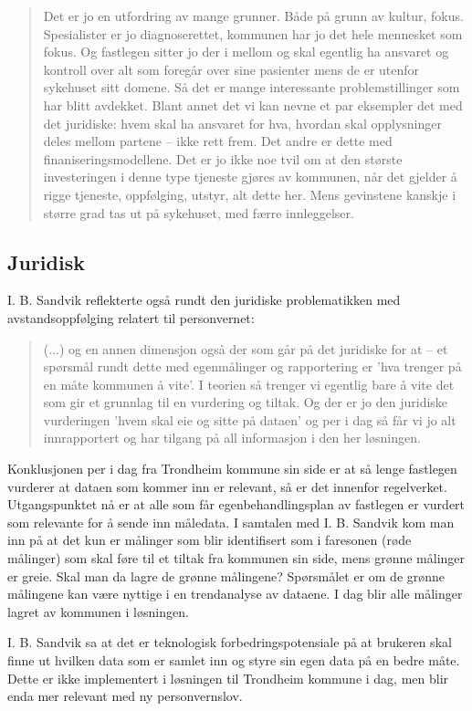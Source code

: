 \blockquote{Det er jo en utfordring av mange grunner. Både på grunn av kultur, fokus. Spesialister er jo diagnoserettet, kommunen har jo det hele mennesket som fokus. Og
    fastlegen sitter jo der i mellom og skal egentlig ha ansvaret og kontroll over alt som foregår over sine pasienter mens de er utenfor sykehuset sitt domene. Så det er
    mange interessante problemstillinger som har blitt avdekket. Blant annet det vi kan nevne et par eksempler det med det juridiske: hvem skal ha ansvaret for hva,
    hvordan skal opplysninger deles mellom partene -- ikke rett frem. Det andre er dette med finaniseringsmodellene. Det er jo ikke noe tvil om at den største investeringen
    i denne type tjeneste gjøres av kommunen, når det gjelder å rigge tjeneste, oppfølging, utstyr, alt dette her. Mens gevinstene kanskje i større
grad tas ut på sykehuset, med færre innleggelser.}

\subsection{Juridisk}
I. B. Sandvik reflekterte også rundt den juridiske problematikken med avstandsoppfølging relatert til personvernet:
\blockquote{(...) og en annen dimensjon også der som går på det juridiske for at -- et spørsmål rundt dette med egenmålinger og rapportering er
'hva trenger på en måte kommunen å vite'. I teorien så trenger vi egentlig bare å vite det som gir et grunnlag til en vurdering og tiltak.
Og der er jo den juridiske vurderingen 'hvem skal eie og sitte på dataen' og per i dag så får vi jo alt innrapportert og har tilgang på
all informasjon i den her løsningen.}

Konklusjonen per i dag fra Trondheim kommune sin side er at så lenge fastlegen vurderer at dataen som kommer inn er relevant, så er det innenfor
regelverket. Utgangspunktet nå er at alle som får egenbehandlingsplan av fastlegen er vurdert som relevante for å sende inn måledata. I samtalen
med I. B. Sandvik kom man inn på at det kun er målinger som blir identifisert som i faresonen (røde målinger) som skal føre til et tiltak fra
kommunen sin side, mens grønne målinger er greie. Skal man da lagre de grønne målingene?
Spørsmålet er om de grønne målingene kan være nyttige i en trendanalyse av dataene.
I dag blir alle målinger lagret av kommunen i løsningen.

I. B. Sandvik sa at det er teknologisk forbedringspotensiale på at brukeren skal finne
ut hvilken data som er samlet inn og styre sin egen data på en bedre måte. Dette er ikke implementert i løsningen til Trondheim kommune i dag,
men blir enda mer relevant med ny personvernslov.

